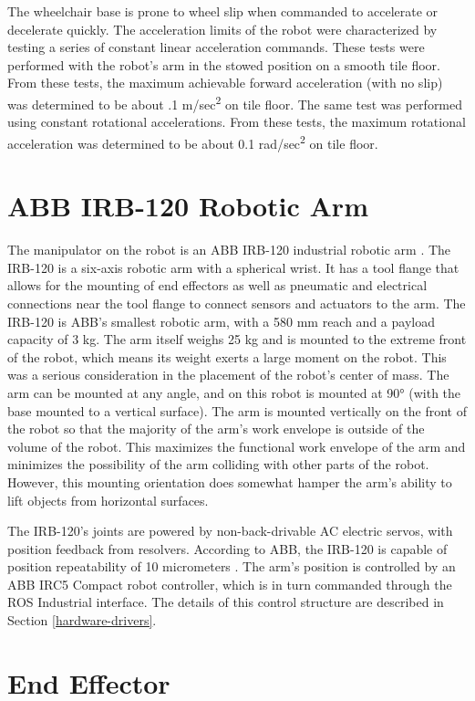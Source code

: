 \documentclass[]{cwru} %
\begin{document}
The wheelchair base is prone to wheel slip when commanded to accelerate
or decelerate quickly. The acceleration limits of the robot were
characterized by testing a series of constant linear acceleration
commands. These tests were performed with the robot's arm in the stowed
position on a smooth tile floor. From these tests, the maximum
achievable forward acceleration (with no slip) was determined to be
about .1 m/sec\textsuperscript{2} on tile floor. The same test was
performed using constant rotational accelerations. From these tests, the
maximum rotational acceleration was determined to be about 0.1
rad/sec\textsuperscript{2} on tile floor.

\section{ABB IRB-120 Robotic Arm}

The manipulator on the robot is an ABB IRB-120 industrial robotic
arm \cite{abb}. The IRB-120 is a six-axis robotic arm with a spherical
wrist. It has a tool flange that allows for the mounting of end
effectors as well as pneumatic and electrical connections near the tool
flange to connect sensors and actuators to the arm. The IRB-120 is ABB's
smallest robotic arm, with a 580 mm reach and a payload capacity of 3
kg. The arm itself weighs 25 kg and is mounted to the extreme front of
the robot, which means its weight exerts a large moment on the robot.
This was a serious consideration in the placement of the robot's center
of mass. The arm can be mounted at any angle, and on this robot is
mounted at 90° (with the base mounted to a vertical surface). The arm is
mounted vertically on the front of the robot so that the majority of the
arm's work envelope is outside of the volume of the robot. This
maximizes the functional work envelope of the arm and minimizes the
possibility of the arm colliding with other parts of the robot. However,
this mounting orientation does somewhat hamper the arm's ability to lift
objects from horizontal surfaces.

The IRB-120's joints are powered by non-back-drivable AC electric
servos, with position feedback from resolvers. According to ABB, the
IRB-120 is capable of position repeatability of 10 micrometers \cite{abb}.
The arm's position is controlled by an ABB IRC5 Compact robot
controller, which is in turn commanded through the ROS Industrial
interface. The details of this control structure are described in Section
\ref{hardware-drivers}.

\section{End Effector}
\end{document}
